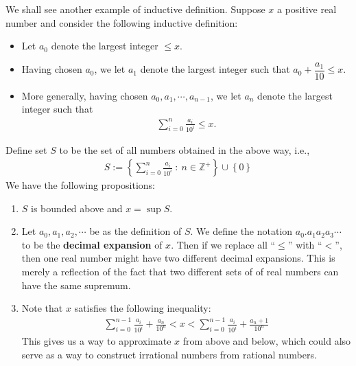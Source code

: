 	\begin{exampleenv}
		We shall see another example of inductive definition. Suppose $x$ a positive real number and consider the following inductive definition:
		\begin{itemize}
			\item Let $a_0$ denote the largest integer $\le x$.
			\item Having chosen $a_0$, we let $a_1$ denote the largest integer such that $a_0+\dfrac{a_1}{10}\le x$.
			\item More generally, having chosen $a_0,a_1,\cdots,a_{n-1}$, we let $a_n$ denote the largest integer such that
			\begin{align*}
				\sum_{i=0}^{n}\frac{a_i}{10^i}\le x.
			\end{align*}
		\end{itemize}
		Define set $S$ to be the set of all numbers obtained in the above way, i.e.,
		\begin{align*}
			S:=\left\{\sum_{i=0}^{n}\frac{a_i}{10^i}\ :\ n\in \mathbb{Z}^+\right\} \cup \left\{0 \right\}
		\end{align*}
		We have the following propositions:
		\begin{enumerate}
			\item $S$ is bounded above and $x=\sup S$.
			\item Let $a_0,a_1,a_2,\cdots$ be as the definition of $S$. We define the notation $a_0.a_1a_2a_3 \cdots$ to be the \textbf{decimal expansion} of $x$. Then if we replace all ``$\le$'' with ``$<$'', then one real number might have two different decimal expansions. This is merely a reflection of the fact that two different sets of of real numbers can have the same supremum.
			\item Note that $x$ satisfies the following inequality:
			\begin{align*}
				\sum_{i=0}^{n-1}\frac{a_i}{10^i}+\frac{a_n}{10^n}<x<\sum_{i=0}^{n-1}\frac{a_i}{10^i}+\frac{a_n+1}{10^n}
			\end{align*}
			This gives us a way to approximate $x$ from above and below, which could also serve as a way to construct irrational numbers from rational numbers.
		\end{enumerate}
	\end{exampleenv}
